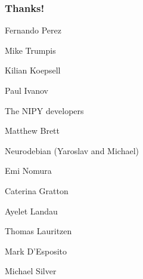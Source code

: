 \documentclass{beamer}
\begin{document}
\begin{frame}
\frametitle{Thanks!}
\pause
Fernando Perez

Mike Trumpis

Kilian Koepsell

Paul Ivanov

\pause
The NIPY developers

Matthew Brett 

\pause
Neurodebian (Yaroslav and Michael)

\pause
Emi Nomura 

Caterina Gratton 

Ayelet Landau 

Thomas Lauritzen

\pause
Mark D'Esposito 

Michael Silver
\end{frame}
\end{document}
